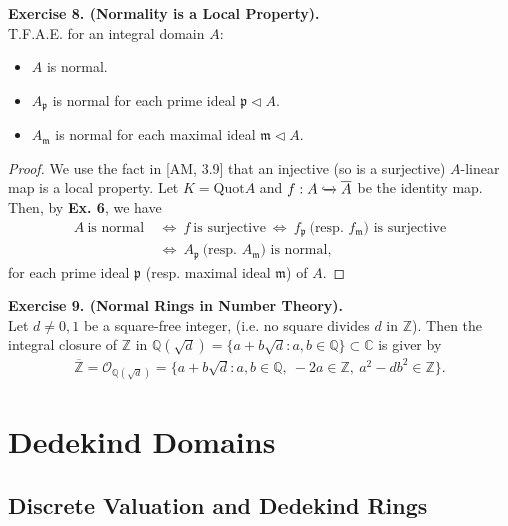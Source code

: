 \documentclass[12pt,a4paper,footinclude=true,headinclude=true]{scrbook} %
\newenvironment{exe}[2][Exercise]
    { \begin{mdframed}[backgroundcolor=gray!20] \textbf{#1 #2.}\\ }
    {  \end{mdframed}}
\begin{document}
\begin{exe}{8. (Normality is a Local Property)}
    T.F.A.E. for an integral domain $A$:
    \begin{itemize}
        \item[(i)] $A$ is normal.
        \item[(ii)] $A_\mathfrak{p}$ is normal for each prime ideal $\mathfrak{p}\triangleleft A$.
        \item[(iii)] $A_\mathfrak{m}$ is normal for each maximal ideal $\mathfrak{m}\triangleleft A$.
    \end{itemize}
\end{exe}
\begin{proof}
    We use the fact in [AM, 3.9] that an injective (so is a surjective) $A$-linear map is a local property. Let $K=\mathrm{Quot}A$ and $f:A\xhookrightarrow{} \overline{A}$ be the identity map. Then, by \textbf{Ex. 6}, we have 
    \begin{align*}
        A\ \text{is normal}\ &\Leftrightarrow\ f\ \text{is surjective}\ \Leftrightarrow\ f_\mathfrak{p}\ \text{(resp. $f_\mathfrak{m}$) is surjective}\\ 
        &\Leftrightarrow\ A_\mathfrak{p}\ \text{(resp. $A_\mathfrak{m}$) is normal},
    \end{align*}
    for each prime ideal $\mathfrak{p}$ (resp. maximal ideal $\mathfrak{m}$) of $A$.
\end{proof}

\begin{exe}{9. (Normal Rings in Number Theory)}
    Let $d\neq0,1$ be a square-free integer, (i.e. no square divides $d$ in $\mathbb{Z}$). Then the integral closure of $\mathbb{Z}$ in $\mathbb{Q}(\sqrt{d})=\{a+b\sqrt{d}:a,b\in\mathbb{Q}\}\subset\mathbb{C}$ is giver by
    \begin{align*}
        \overline{\mathbb{Z}}=\mathcal{O}_{\mathbb{Q}(\sqrt{d})}= \{a+b\sqrt{d}:a,b\in\mathbb{Q},\ -2a\in\mathbb{Z},\ a^2-db^2\in\mathbb{Z}\}.
    \end{align*}
\end{exe}

\chapter{Dedekind Domains}

\section{Discrete Valuation and Dedekind Rings}
\end{document}
